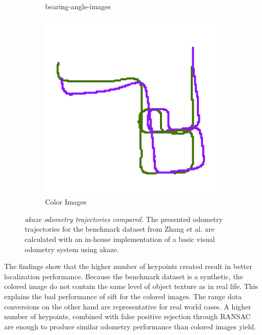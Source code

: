 \begin{figure}[htp]
\begin{subfigure}[t]{0.31\linewidth}
    \caption{\glspl{bearing-angle-image}}
\end{subfigure}%
\begin{subfigure}[t]{0.31\linewidth}
    \includegraphics[width=\linewidth]{chapter06/odo/zhang_pinhole_AKAZE_nice.png}%
    \caption{Color Images}
\end{subfigure}
\caption[\acrshort{akaze} odometry trajectories compared]{\emph{\acrshort{akaze} odometry trajectories compared.} The presented odometry trajectories for the benchmark dataset from Zhang et al.\cite{zhang_icra2016} are calculated with an in-house implementation of a basic visual odometry system using \acrshort{akaze}.}\label{fig:akaze_odometry}
\end{figure}
The findings show that the higher number of keypoints created result in better localization performance.
Because the benchmark dataset is a synthetic, the colored image do not contain the same level of object texture as in real life.
This explains the bad performance of \acrshort{sift} for the colored images.
The range data conversions on the other hand are representative for real world cases.
A higher number of keypoints, combined with false positive rejection through \acrshort{RANSAC} are enough to produce similar odometry performance than colored images yield.
